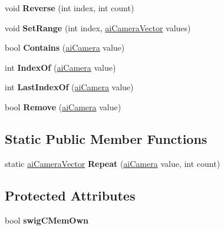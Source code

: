 \begin{DoxyCompactItemize}
\item 
\hypertarget{classai_camera_vector_ab4d103069aff444d9a186856b08889dd}{void {\bfseries Reverse} (int index, int count)}\label{classai_camera_vector_ab4d103069aff444d9a186856b08889dd}

\item 
\hypertarget{classai_camera_vector_a32ebd4ed92fee9e3b21ba3851c23539e}{void {\bfseries Set\+Range} (int index, \hyperlink{classai_camera_vector}{ai\+Camera\+Vector} values)}\label{classai_camera_vector_a32ebd4ed92fee9e3b21ba3851c23539e}

\item 
\hypertarget{classai_camera_vector_ae24a69d2f306c385287ac8d0f515ca3a}{bool {\bfseries Contains} (\hyperlink{structai_camera}{ai\+Camera} value)}\label{classai_camera_vector_ae24a69d2f306c385287ac8d0f515ca3a}

\item 
\hypertarget{classai_camera_vector_ab4ff13a263af49243d204efff58fe47c}{int {\bfseries Index\+Of} (\hyperlink{structai_camera}{ai\+Camera} value)}\label{classai_camera_vector_ab4ff13a263af49243d204efff58fe47c}

\item 
\hypertarget{classai_camera_vector_ae823f2ae8db64b7cb00b4425414decd2}{int {\bfseries Last\+Index\+Of} (\hyperlink{structai_camera}{ai\+Camera} value)}\label{classai_camera_vector_ae823f2ae8db64b7cb00b4425414decd2}

\item 
\hypertarget{classai_camera_vector_a0c64fffe393122ae2db0e6789312b546}{bool {\bfseries Remove} (\hyperlink{structai_camera}{ai\+Camera} value)}\label{classai_camera_vector_a0c64fffe393122ae2db0e6789312b546}

\end{DoxyCompactItemize}
\subsection*{Static Public Member Functions}
\begin{DoxyCompactItemize}
\item 
\hypertarget{classai_camera_vector_a0d468b22659a8240dd5ac2c585b14338}{static \hyperlink{classai_camera_vector}{ai\+Camera\+Vector} {\bfseries Repeat} (\hyperlink{structai_camera}{ai\+Camera} value, int count)}\label{classai_camera_vector_a0d468b22659a8240dd5ac2c585b14338}

\end{DoxyCompactItemize}
\subsection*{Protected Attributes}
\begin{DoxyCompactItemize}
\item 
\hypertarget{classai_camera_vector_ae5cf1d5f28cca237dbb581de4fbbe534}{bool {\bfseries swig\+C\+Mem\+Own}}\label{classai_camera_vector_ae5cf1d5f28cca237dbb581de4fbbe534}

\end{DoxyCompactItemize}
